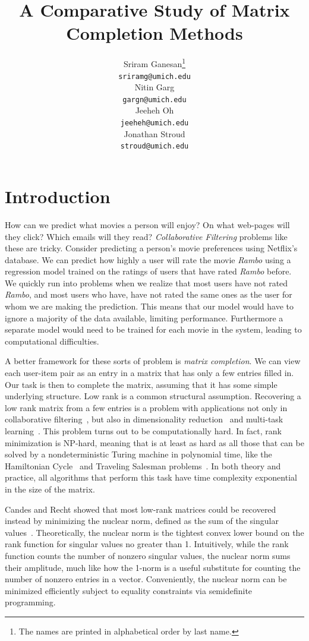 \documentclass{article} %
\title{A Comparative Study of Matrix Completion Methods}
\author{
Sriram Ganesan\thanks{ The names are printed in alphabetical order by last name.} \\
\texttt{sriramg@umich.edu} \\
\And
Nitin Garg \\
\texttt{gargn@umich.edu} \\
\AND
Jeeheh Oh \\
\texttt{jeeheh@umich.edu} \\
\And
Jonathan Stroud \\
\texttt{stroud@umich.edu} \\
}
\begin{document}
\maketitle

\begin{abstract}

\end{abstract}

\section{Introduction}

How can we predict what movies a person will enjoy? On what web-pages
will they click? Which emails will they read? \emph{Collaborative
  Filtering} problems like these are tricky. Consider predicting a
person's movie preferences using Netflix's database. We can predict
how highly a user will rate the movie \textit{Rambo} using a
regression model trained on the ratings of users that have rated
\textit{Rambo} before. We quickly run into problems when we realize
that most users have not rated \textit{Rambo}, and most users who
have, have not rated the same ones as the user for whom we are making
the prediction. This means that our model would have to ignore a
majority of the data available, limiting performance. Furthermore a
separate model would need to be trained for each movie in the system,
leading to computational difficulties.

A better framework for these sorts of problem is \emph{matrix
  completion}. We can view each user-item pair as an entry in a matrix
that has only a few entries filled in. Our task is then to complete
the matrix, assuming that it has some simple underlying structure. Low
rank is a common structural assumption. Recovering a low rank matrix
from a few entries is a problem with applications not only in
collaborative filtering~\cite{r25}, but also in dimensionality
reduction~\cite{r20, r28} and multi-task learning~\cite{r2, r22}. This
problem turns out to be computationally hard. In fact, rank
minimization is NP-hard, meaning that is at least as hard as all those
that can be solved by a nondeterministic Turing machine in polynomial
time, like the Hamiltonian Cycle~\cite{plesn} and Traveling Salesman problems~\cite{lawler1985}. In
both theory and practice, all algorithms that perform this task have
time complexity exponential in the size of the matrix.

Candes and Recht showed that most low-rank matrices could be recovered instead by minimizing the nuclear norm, defined as the sum of the
singular values~\cite{r4}. Theoretically, the nuclear
norm is the tightest convex lower bound on the rank function for
singular values no greater than 1. Intuitively, while the rank
function counts the number of nonzero singular values, the nuclear
norm sums their amplitude, much like how the 1-norm is a useful
substitute for counting the number of nonzero entries in a vector.
Conveniently, the nuclear norm can be minimized efficiently subject to
equality constraints via semidefinite programming.
\end{document}
